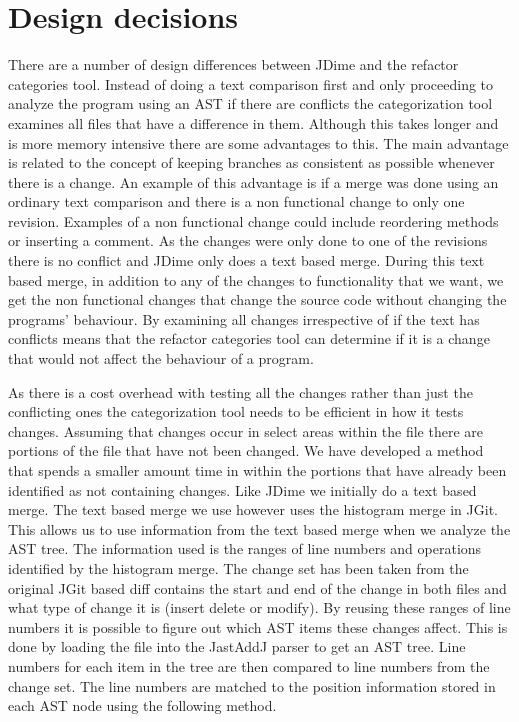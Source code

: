 \section{Design decisions}
 There are a number of design differences between JDime and the refactor categories tool.  Instead of doing a text comparison first and only proceeding to analyze the program using an AST if there are conflicts the categorization tool examines all files that have a difference in them.  Although this takes longer and is more memory intensive there are some advantages to this. The main advantage is related to the concept of keeping branches as consistent as possible whenever there is a change. An example of this advantage is if a merge was done using an ordinary text comparison and there is a non functional change to only one revision. Examples of a non functional change could include reordering methods or inserting a comment.  As the changes were only done to one of the revisions there is no conflict and JDime only does a text based merge.  During this text based merge, in addition to any of the changes to functionality that we want, we get the non functional changes that change the source code without changing the programs' behaviour. By examining all changes irrespective of if the text has conflicts means that the refactor categories tool can determine if it is a change that would not affect the behaviour of a program.

As there is a cost overhead with testing all the changes rather than just the conflicting ones the categorization tool needs to be efficient in how it tests changes.  Assuming that changes occur in select areas within the file there are portions of the file that have not been changed.  We have developed a method that spends a smaller amount time in  within the portions that have already been identified as not containing changes.  Like JDime we initially do a text based merge.  The text based merge we use however uses the histogram merge in JGit.  This allows us to use information from the text based merge when we analyze the AST tree.  The information used is the ranges of line numbers and operations identified by the histogram merge. The change set has been taken from the original JGit based diff contains the start and end of the change in both files and what type of change it is (insert delete or modify).  By reusing these ranges of line numbers it is possible to figure out which AST items these changes affect. This is done by loading the file into the JastAddJ parser to get an AST tree. Line numbers for each item in the tree are then compared to line numbers from the change set. The line numbers are matched to the position information stored in each AST node using the following method.

